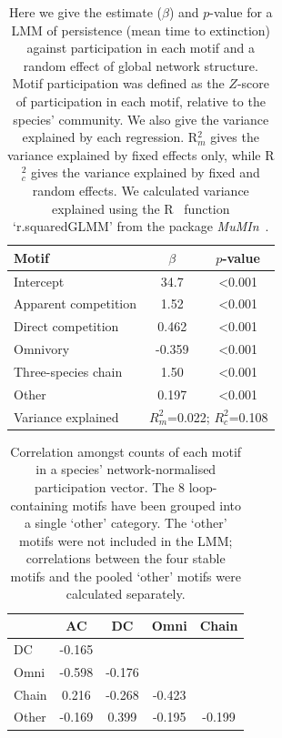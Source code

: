 \documentclass[12pt]{article}
\begin{document}
\begin{spacing}{2.0}
		\begin{table}[hb!]
		\caption{Here we give the estimate ($\beta$) and $p$-value for a LMM of persistence (mean time to extinction) against participation in each motif and a random effect of global network structure.  Motif participation was defined as the $Z$-score of participation in each motif, relative to the species' community. We also give the variance explained by each regression. R$^{2}_{m}$ gives the variance explained by fixed effects only, while R$^{2}_{c}$ gives the variance explained by fixed and random effects. We calculated variance explained using the R~\citep{R} function `r.squaredGLMM' from the package \emph{MuMIn}~\citep{MuMIn}.}
		\label{tab:persistence_Z}
		\begin{tabular}{l | c c}
		 Motif & $\beta$ & $p$-value \\  
		 \hline
		 Intercept & 34.7 & \textless0.001 \\
		 \hline
		 Apparent competition & 1.52 & \textless0.001 \\
		 Direct competition &  0.462  & \textless0.001 \\
		 Omnivory & -0.359  & \textless0.001 \\
		 Three-species chain & 1.50 & \textless0.001 \\
		 Other &  0.197  & \textless0.001 \\
		 \hline
		 Variance explained & \multicolumn{2}{c}{$R^{2}_m$=0.022; $R^{2}_c$=0.108} \\
		 \hline
		 \end{tabular}
		 \end{table}


		\begin{table}[hb!]
		\caption{Correlation amongst counts of each motif in a species' network-normalised participation vector. The 8 loop-containing motifs have been grouped into a single `other' category. The `other' motifs were not included in the LMM; correlations between the four stable motifs and the pooled `other' motifs were calculated separately.}
		\label{tab:Z_correlations}
		\begin{tabular}{l | c c c c}
			& AC & DC & Omni & Chain \\
		\hline
		DC     & -0.165 &        &        &    \\
		Omni   & -0.598 & -0.176 &        &     \\
		Chain  &  0.216 & -0.268 & -0.423 &      \\
		Other  & -0.169 &  0.399 & -0.195 & -0.199 \\
		\hline
		\end{tabular}
		\end{table}



\end{spacing}
\end{document}
